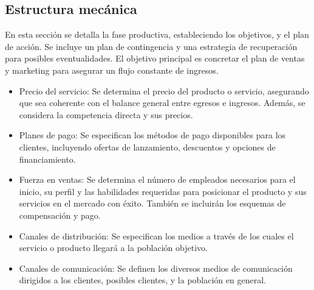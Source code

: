{\color{red}
\subsection{Estructura mecánica}

En esta sección se detalla la fase productiva, estableciendo los objetivos, y el plan
de acción. Se incluye un plan de contingencia y una estrategia
de recuperación para posibles eventualidades. El objetivo principal es concretar el plan de ventas y marketing para asegurar un flujo constante de ingresos.

\begin{itemize}
    \item Precio del servicio: Se determina el precio del producto o servicio, asegurando que sea coherente con el balance general entre egresos e ingresos. Además, se considera la competencia directa y sus precios.
    
    \item Planes de pago: Se especifican los métodos de pago disponibles para los clientes, incluyendo ofertas de lanzamiento, descuentos y opciones de financiamiento.

    \item Fuerza en ventas: Se determina el número de empleados necesarios para el inicio, su perfil y las habilidades requeridas para posicionar el producto y sus servicios en el mercado con éxito. También se incluirán los esquemas de compensación y pago.

    \item Canales de distribución: Se especifican los medios a través de los cuales el servicio o producto llegará a la población objetivo.
    
    \item Canales de comunicación: Se definen los diversos medios de comunicación dirigidos a los clientes, posibles clientes, y la población en general.
\end{itemize}
}